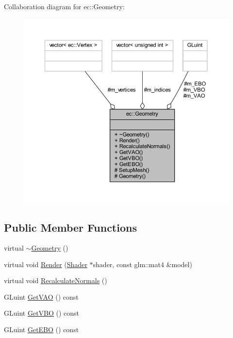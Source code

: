 Collaboration diagram for ec\+:\+:Geometry\+:\nopagebreak
\begin{figure}[H]
\begin{center}
\leavevmode
\includegraphics[width=350pt]{classec_1_1_geometry__coll__graph}
\end{center}
\end{figure}
\subsection*{Public Member Functions}
\begin{DoxyCompactItemize}
\item 
virtual \mbox{\hyperlink{classec_1_1_geometry_a964c581313da2be51a3c78d3be7f48b3}{$\sim$\+Geometry}} ()
\item 
virtual void \mbox{\hyperlink{classec_1_1_geometry_a8de70c6fd7391ec0555b2df57912b177}{Render}} (\mbox{\hyperlink{classec_1_1_shader}{Shader}} $\ast$shader, const glm\+::mat4 \&model)
\item 
virtual void \mbox{\hyperlink{classec_1_1_geometry_a660f620c773555a6f9b4f2ad38384450}{Recalculate\+Normals}} ()
\item 
G\+Luint \mbox{\hyperlink{classec_1_1_geometry_a904043350205cd33d95a4242a32bb2f4}{Get\+V\+AO}} () const
\item 
G\+Luint \mbox{\hyperlink{classec_1_1_geometry_a4c97679ded851fbcfd82c4dc9a7c9911}{Get\+V\+BO}} () const
\item 
G\+Luint \mbox{\hyperlink{classec_1_1_geometry_a5a4267fdce08b8b71a7cd7956b865064}{Get\+E\+BO}} () const
\end{DoxyCompactItemize}
